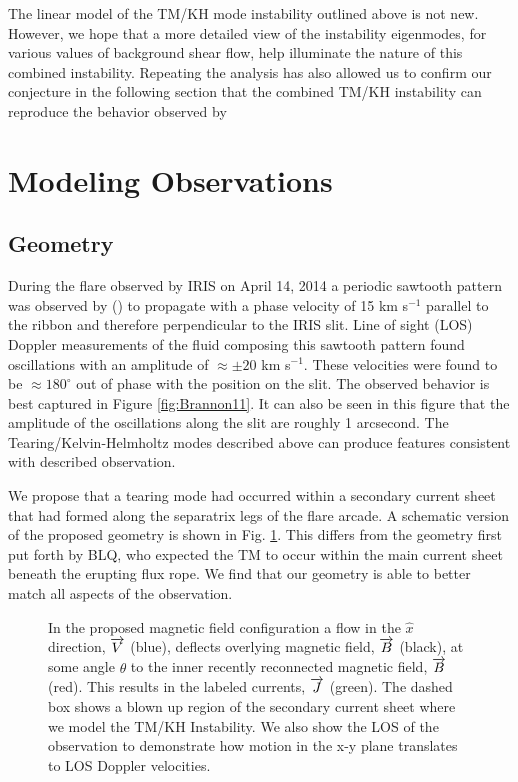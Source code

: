	The linear model of the TM/KH mode instability outlined above is not new. However, we hope that a more detailed view of the instability eigenmodes, for various values of background shear flow, help illuminate the nature of this combined instability.  Repeating the analysis has also allowed us to confirm our conjecture in the following section that the combined TM/KH instability can reproduce the behavior observed by \citet{Brannon2015}


	

\section{Modeling Observations}

\subsection{Geometry}
	During the flare observed by IRIS on April 14, 2014 a periodic sawtooth pattern was observed by \citet{Brannon2015} (\BLQ) to propagate with a phase velocity of 15 km s$^{-1}$ parallel to the ribbon and therefore perpendicular to the IRIS slit.  Line of sight (LOS) Doppler measurements of the fluid composing this sawtooth pattern found oscillations with an amplitude of $\approx \pm20$ km s$^{-1}$.  These velocities were found to be $\approx 180^{\circ}$ out of phase with the position on the slit. The observed behavior is best captured in Figure \ref{fig:Brannon11}.  It can also be seen in this figure that the amplitude of the oscillations along the slit are roughly 1 arcsecond. The Tearing/Kelvin-Helmholtz modes described above can produce features consistent with described observation. 
	
	We propose that a tearing mode had occurred within a secondary current sheet that had formed along the separatrix legs of the flare arcade.  A schematic version of the proposed geometry is shown in Fig. \ref{fig:cartoon}.  This differs from the geometry first put forth by BLQ, who expected the TM to occur within the main current sheet beneath the erupting flux rope.  We find that our geometry is able to better match all aspects of the observation.      
		
	\begin{figure}[htbp]	
	\caption{In the proposed magnetic field configuration a flow in the $\hat{x}$ direction, $\protect\overrightarrow{V}$ (blue), deflects overlying magnetic field, $\protect\overrightarrow{B}$ (black), at some angle $\theta$ to the inner recently reconnected magnetic field, $\protect\overrightarrow{B}$ (red).  This results in the labeled currents, $\protect\overrightarrow{J}$ (green).  The dashed box shows a blown up region of the secondary current sheet where we model the TM/KH Instability.  We also show the LOS of the observation to demonstrate how motion in the x-y plane translates to LOS Doppler velocities.}
	\label{fig:cartoon}
	
	\centerline{} 

	\end{figure}
	
